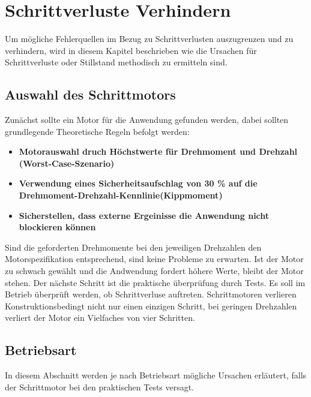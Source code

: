 %

\chapter{Schrittverluste Verhindern}
Um mögliche Fehlerquellen im Bezug zu Schrittverlusten auszugrenzen und zu verhindern, wird in diesem Kapitel beschrieben wie die Ursachen für Schrittverluste oder Stillstand methodisch zu ermitteln sind. 

\section{Auswahl des Schrittmotors}
Zunächst sollte ein Motor für die Anwendung gefunden werden, dabei sollten grundlegende Theoretische Regeln befolgt werden:
\begin{itemize}
	\item {\textbf{Motorauswahl druch Höchstwerte für Drehmoment und Drehzahl (Worst-Case-Szenario)}}
	\item {\textbf{Verwendung eines Sicherheitsaufschlag von 30 \% auf die Drehmoment-Drehzahl-Kennlinie(Kippmoment)}}
	\item {\textbf{Sicherstellen, dass externe Ergeinisse die Anwendung nicht blockieren können}}
\end{itemize}

Sind die geforderten Drehmomente bei den jeweiligen Drehzahlen den Motorspezifikation entsprechend, sind keine Probleme zu erwarten. Ist der Motor zu schwach gewählt und die Andwendung fordert höhere Werte, bleibt der Motor stehen. 
Der nächste Schritt ist die praktische überprüfung durch Tests. Es soll im Betrieb überprüft werden, ob Schrittverluse auftreten. Schrittmotoren verlieren Konstruktionsbedingt nicht nur einen einzigen Schritt, bei geringen Drehzahlen verliert der Motor ein Vielfaches von vier Schritten.


\section{Betriebsart}

In diesem Abschnitt werden je nach Betriebsart mögliche Ursachen erläutert, falls der Schrittmotor bei den praktischen Tests versagt. 
